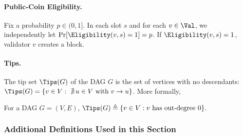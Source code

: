\paragraph{Public-Coin Eligibility.} Fix a probability $p\in(0,1]$. In each slot $s$ and for each $v\in\Val$, we independently let $\Pr[\Eligibility(v,s)=1] = p$. 
If $\Eligibility(v,s)=1$, validator $v$ creates a block.

\paragraph{Tips.} The tip set $\Tips(G)$ of the DAG $G$ is the set of vertices with no descendants: $\Tips(G)=\{v\in V:\ \nexists\,u\in V \text{ with } v\to u\}$. More formally, 

\begin{definition}[Tips]
For a DAG $G=(V,E)$, $\Tips(G)\triangleq\{v\in V:\text{$v$ has out-degree $0$}\}$.
\end{definition}

\subsubsection*{Additional Definitions Used in this Section}

